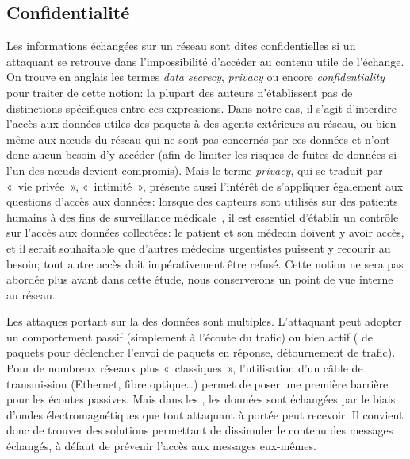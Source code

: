 \subsection{Confidentialité}

Les informations échangées sur un réseau sont dites confidentielles si un attaquant se retrouve dans l'impossibilité d'accéder au contenu utile de l'échange.
On trouve en anglais les termes \textit{data secrecy}, \textit{privacy} ou encore \textit{confidentiality} pour traiter de cette notion: la plupart des auteurs n'établissent pas de distinctions spécifiques entre ces expressions.
Dans notre cas, il s'agit d'interdire l'accès aux données utiles des paquets à des agents extérieurs au réseau, ou bien même aux nœuds du réseau qui ne sont pas concernés par ces données et n'ont donc aucun besoin d'y accéder (afin de limiter les risques de fuites de données si l'un des nœuds devient compromis).
Mais le terme \textit{privacy}, qui se traduit par « vie privée », « intimité », présente aussi l'intérêt de s'appliquer également aux questions d'accès aux données: lorsque des capteurs sont utilisés sur des patients humains à des fins de surveillance médicale~\cite{SZFDXC14}, il est essentiel d'établir un contrôle sur l'accès aux données collectées: le patient et son médecin doivent y avoir accès, et il serait souhaitable que d'autres médecins urgentistes puissent y recourir au besoin; tout autre accès doit impérativement être refusé.
Cette notion ne sera pas abordée plus avant dans cette étude, nous conserverons un point de vue interne au réseau.

Les attaques portant sur la  des données sont multiples.
L'attaquant peut adopter un comportement passif (simplement à l'écoute du trafic) ou bien actif ( de paquets pour déclencher l'envoi de paquets en réponse, détournement de trafic).
Pour de nombreux réseaux plus « classiques », l'utilisation d'un câble de transmission (Ethernet, fibre optique\dots) permet de poser une première barrière pour les écoutes passives.
Mais dans les \rcs, les données sont échangées par le biais d'ondes électromagnétiques que tout attaquant à portée peut recevoir.
Il convient donc de trouver des solutions permettant de dissimuler le contenu des messages échangés, à défaut de prévenir l'accès aux messages eux-mêmes.

